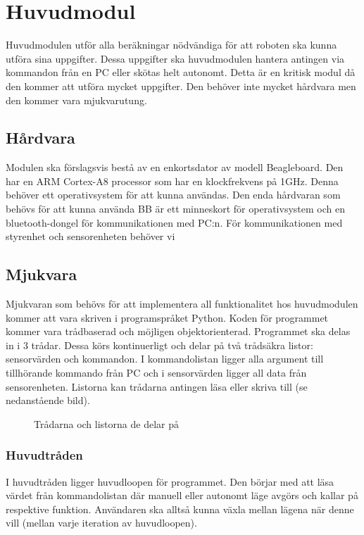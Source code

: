 \setcounter{secnumdepth}{5}
\section{Huvudmodul}
Huvudmodulen utför alla beräkningar nödvändiga för att roboten ska kunna utföra sina uppgifter. Dessa uppgifter ska huvudmodulen hantera antingen via kommandon från en PC eller skötas helt autonomt. Detta är en kritisk modul då den kommer att utföra mycket uppgifter. Den behöver inte mycket hårdvara men den kommer vara mjukvarutung.

\subsection{Hårdvara}
Modulen ska förslagsvis bestå av en enkortsdator av modell Beagleboard. Den har en ARM Cortex-A8 processor som har en klockfrekvens på 1GHz. Denna behöver ett operativsystem för att kunna användas. Den enda hårdvaran som behövs för att kunna använda BB är ett minneskort för operativsystem och en bluetooth-dongel för kommunikationen med PC:n. För kommunikationen med styrenhet och sensorenheten behöver vi 
\subsection{Mjukvara}
Mjukvaran som behövs för att implementera all funktionalitet hos huvudmodulen kommer att vara skriven i programspråket Python. Koden för programmet kommer vara trådbaserad och möjligen objektorienterad. 
\newline
Programmet ska delas in i 3 trådar. Dessa körs kontinuerligt och delar på två trådsäkra listor: sensorvärden och kommandon. I kommandolistan ligger alla argument till tillhörande kommando från PC och i sensorvärden ligger all data från sensorenheten. Listorna kan trådarna antingen läsa eller skriva till (se nedanstående bild).

\begin{figure}[h]
\scalebox{0.8}{}
\caption{Trådarna och listorna de delar på}
\end{figure}

\subsubsection{Huvudtråden}
I huvudtråden ligger huvudloopen för programmet. Den börjar med att läsa värdet från kommandolistan där manuell eller autonomt läge avgörs och kallar på respektive funktion. Användaren ska alltså kunna växla mellan lägena när denne vill (mellan varje iteration av huvudloopen).
